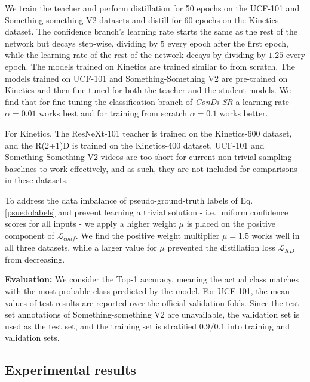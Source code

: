 \documentclass[a4paper,conference]{IEEEtran}
\begin{document}
We train the teacher and perform distillation for 50 epochs on the UCF-101 and Something-something V2 datasets and distill for 60 epochs on the Kinetics dataset. The confidence branch's learning rate starts the same as the rest of the network but decays step-wise, dividing by $5$ every epoch after the first epoch, while the learning rate of the rest of the network decays by dividing by $1.25$ every epoch. The models trained on Kinetics are trained similar to \cite{Hara_2018_CVPR} from scratch. The models trained on UCF-101 and Something-Something V2 are pre-trained on Kinetics and then fine-tuned for both the teacher and the student models. We find that for fine-tuning the classification branch of \textit{ConDi-SR} a learning rate $\alpha = 0.01$ works best and for training from scratch $\alpha = 0.1$ works better.

For Kinetics, The ResNeXt-101 teacher is trained on the Kinetics-600 dataset, and the R(2+1)D is trained on the Kinetics-400 dataset. UCF-101 and Something-Something V2 videos are too short for current non-trivial sampling baselines \cite{korbar2019scsampler, gao2020listen} to work effectively, and as such, they are not included for comparisons in these datasets.

To address the data imbalance of pseudo-ground-truth labels of Eq. \ref{psuedolabels} and prevent learning a trivial solution - i.e. uniform confidence scores for all inputs - we apply a higher weight $\mu$ is placed on the positive component of $\mathcal{L}_{\mathit{conf}}$. We find the positive weight multiplier $\mu = 1.5$ works well in all three datasets, while a larger value for $\mu$ prevented the distillation loss $\mathcal{L}_{KD}$ from decreasing. 
 
{\bf Evaluation:} We consider the Top-1 accuracy, meaning the actual class matches with the most probable class predicted by the model. For UCF-101, the mean values of test results are reported over the official validation folds. Since the test set annotations of Something-something V2 are unavailable, the validation set is used as the test set, and the training set is stratified $0.9/0.1$ into training and validation sets.

\subsection{Experimental results}
\end{document}

